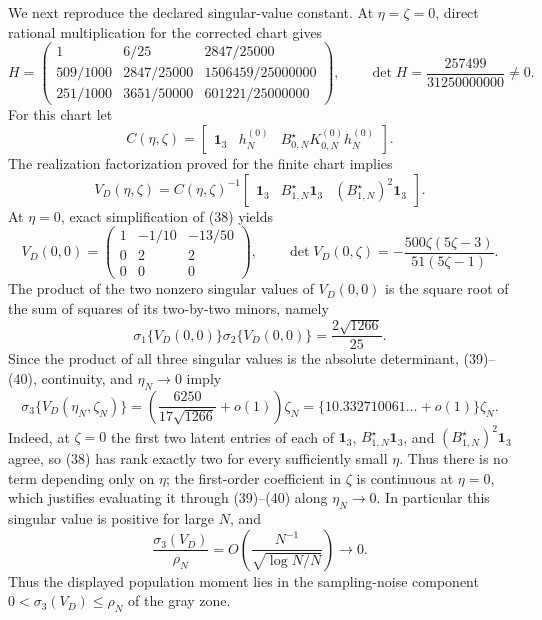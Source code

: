 We next reproduce the declared singular-value constant.  At \(\eta=\zeta=0\), direct rational multiplication for the corrected chart gives
\[
 H=
 \begin{pmatrix}
 1&6/25&2847/25000\\
 509/1000&2847/25000&1506459/25000000\\
 251/1000&3651/50000&601221/25000000
 \end{pmatrix},
 \qquad
 \det H=\frac{257499}{31250000000}\ne0.                       \tag{37}
\]
For this chart let
\[
 C(\eta,\zeta)=\begin{bmatrix}\mathbf 1_3&h_N^{(0)}&B_{0,N}^{\star}K_{0,N}^{(0)}h_N^{(0)}\end{bmatrix}.
\]
The realization factorization proved for the finite chart implies
\[
 V_D(\eta,\zeta)
 =C(\eta,\zeta)^{-1}
 \begin{bmatrix}\mathbf 1_3&B_{1,N}^{\star}\mathbf 1_3&(B_{1,N}^{\star})^2\mathbf 1_3\end{bmatrix}. \tag{38}
\]
At \(\eta=0\), exact simplification of (38) yields
\[
 V_D(0,0)=
 \begin{pmatrix}1&-1/10&-13/50\\0&2&2\\0&0&0\end{pmatrix},
 \qquad
 \det V_D(0,\zeta)=-\frac{500\zeta(5\zeta-3)}{51(5\zeta-1)}. \tag{39}
\]
The product of the two nonzero singular values of \(V_D(0,0)\) is the square root of the sum of squares of its two-by-two minors, namely
\[
 \sigma_1\{V_D(0,0)\}\sigma_2\{V_D(0,0)\}=\frac{2\sqrt{1266}}{25}. \tag{40}
\]
Since the product of all three singular values is the absolute determinant, (39)--(40), continuity, and \(\eta_N\to0\) imply
\[
 \sigma_3\{V_D(\eta_N,\zeta_N)\}
 =\left(\frac{6250}{17\sqrt{1266}}+o(1)\right)\zeta_N
 =\{10.332710061\ldots+o(1)\}\zeta_N.                         \tag{41}
\]
Indeed, at \(\zeta=0\) the first two latent entries of each of \(\mathbf 1_3\), \(B_{1,N}^{\star}\mathbf 1_3\), and \((B_{1,N}^{\star})^2\mathbf 1_3\) agree, so (38) has rank exactly two for every sufficiently small \(\eta\).  Thus there is no term depending only on \(\eta\); the first-order coefficient in \(\zeta\) is continuous at \(\eta=0\), which justifies evaluating it through (39)--(40) along \(\eta_N\to0\).
In particular this singular value is positive for large \(N\), and
\[
 \frac{\sigma_3(V_D)}{\rho_N}
 =O\!\left(\frac{N^{-1}}{\sqrt{\log N/N}}\right)\to0.         \tag{42}
\]
Thus the displayed population moment lies in the sampling-noise component \(0<\sigma_3(V_D)\le\rho_N\) of the gray zone.

